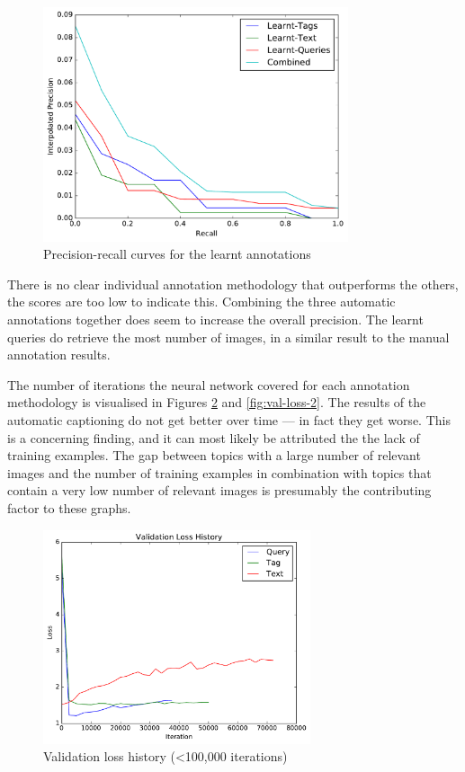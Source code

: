 \begin{figure}[ht]
    \centering
    \includegraphics[width=0.8\textwidth]{graphs/learnt-result}
    \caption{Precision-recall curves for the learnt annotations}
    \label{fig:manual-result}
\end{figure}

\FloatBarrier
There is no clear individual annotation methodology that outperforms the others, the scores are too low to indicate this. Combining the three automatic annotations together does seem to increase the overall precision. The learnt queries do retrieve the most number of images, in a similar result to the manual annotation results.

The number of iterations the neural network covered for each annotation methodology is visualised in Figures \ref{fig:val-loss-1} and \ref{fig:val-loss-2}. The results of the automatic captioning do not get better over time --- in fact they get worse. This is a concerning finding, and it can most likely be attributed the the lack of training examples. The gap between topics with a large number of relevant images and the number of training examples in combination with topics that contain a very low number of relevant images is presumably the contributing factor to these graphs.

\vfill
\FloatBarrier

\begin{figure}
    \centering
    \includegraphics[width=0.7\textwidth]{graphs/initial-validation-loss-history}
    \caption{Validation loss history (\textless 100,000 iterations)}
    \label{fig:val-loss-1}
\end{figure}

